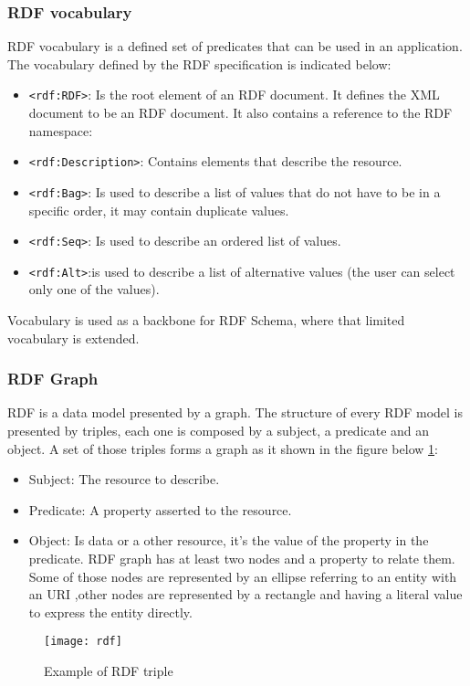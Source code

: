 \subsubsection{RDF vocabulary}
\noindent RDF vocabulary \cite{rdfv} is a defined set of predicates that can be used in an application.
The vocabulary defined by the RDF specification is indicated below:\begin{itemize}
\item \texttt{<rdf:RDF>}: Is the root element of an RDF document. It defines the XML document to be an RDF document. It also contains a reference to the RDF namespace:
\item \texttt{<rdf:Description>}: Contains elements that describe the resource.
\item \texttt{<rdf:Bag>}: Is used to describe a list of values that do not have to be in a specific order, it may contain duplicate values.
\item \texttt{<rdf:Seq>}: Is used to describe an ordered list of values.
\item \texttt{<rdf:Alt>}:is used to describe a list of alternative values (the user can select only one of the values).
\end{itemize}
Vocabulary is used as a backbone for RDF Schema, where that limited vocabulary is extended.



\subsubsection{RDF Graph}
RDF is a data model presented by a graph. The structure of every RDF model is presented by triples, each one is composed by a subject, a predicate and an object. A set of those triples forms a graph as it shown in the figure below  \ref{fig_rdf}:
\begin{itemize} 
\item Subject: The resource to describe.
\item Predicate: A property asserted to the resource.
\item Object: Is data or a other resource, it's the value of the property in the predicate.
RDF graph has at least two nodes and a property to relate them. Some of those nodes are represented by an ellipse referring to an entity with an URI ,other nodes are represented by a rectangle and having a literal value to express the entity directly.
 \end{itemize}
 \begin{figure}[H]
\centering
\texttt{[image: rdf]}
\caption{Example of RDF triple }
\label{fig_rdf}
\end{figure}


